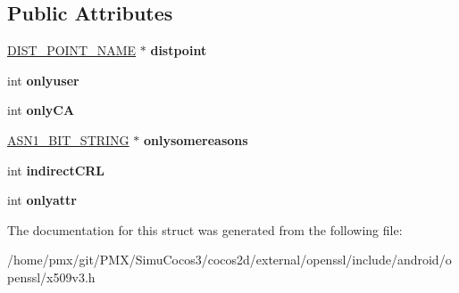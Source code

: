 \subsection*{Public Attributes}
\begin{DoxyCompactItemize}
\item 
\mbox{\label{structISSUING__DIST__POINT__st_afa17c1a35b47cf328c1cc3b8af01d177}} 
\hyperlink{structDIST__POINT__NAME__st}{D\+I\+S\+T\+\_\+\+P\+O\+I\+N\+T\+\_\+\+N\+A\+ME} $\ast$ {\bfseries distpoint}
\item 
\mbox{\label{structISSUING__DIST__POINT__st_ad0d25508c76cac7e0d7f4bb0ac1d64d3}} 
int {\bfseries onlyuser}
\item 
\mbox{\label{structISSUING__DIST__POINT__st_a12e9fbf6b321e3b7736e78ae24f89d72}} 
int {\bfseries only\+CA}
\item 
\mbox{\label{structISSUING__DIST__POINT__st_a9628109be2d3ff2ecdf9ef1638286702}} 
\hyperlink{structasn1__string__st}{A\+S\+N1\+\_\+\+B\+I\+T\+\_\+\+S\+T\+R\+I\+NG} $\ast$ {\bfseries onlysomereasons}
\item 
\mbox{\label{structISSUING__DIST__POINT__st_a9872380cab3fa8a4d58ae149ca7bac16}} 
int {\bfseries indirect\+C\+RL}
\item 
\mbox{\label{structISSUING__DIST__POINT__st_abbf8e7d0171fafc31d395b1804490ba5}} 
int {\bfseries onlyattr}
\end{DoxyCompactItemize}


The documentation for this struct was generated from the following file\+:\begin{DoxyCompactItemize}
\item 
/home/pmx/git/\+P\+M\+X/\+Simu\+Cocos3/cocos2d/external/openssl/include/android/openssl/x509v3.\+h\end{DoxyCompactItemize}
